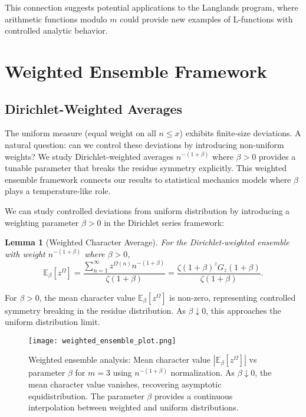 \documentclass[12pt]{article}
\newtheorem{lemma}[theorem]{Lemma}
\theoremstyle{definition}
\theoremstyle{remark}
\begin{document}
This connection suggests potential applications to the Langlands program, where arithmetic functions modulo $m$ could provide new examples of L-functions with controlled analytic behavior.

\section{Weighted Ensemble Framework}

\subsection{Dirichlet-Weighted Averages}

The uniform measure (equal weight on all $n \leq x$) exhibits finite-size deviations. A natural question: can we control these deviations by introducing non-uniform weights? We study Dirichlet-weighted averages $n^{-(1+\beta)}$ where $\beta > 0$ provides a tunable parameter that breaks the residue symmetry explicitly. This weighted ensemble framework connects our results to statistical mechanics models where $\beta$ plays a temperature-like role.

We can study controlled deviations from uniform distribution by introducing a weighting parameter $\beta > 0$ in the Dirichlet series framework:

\begin{lemma}[Weighted Character Average]
For the Dirichlet-weighted ensemble with weight $n^{-(1+\beta)}$ where $\beta > 0$,
\[
\mathbb{E}_\beta[z^{\Omega}] = \frac{\sum_{n=1}^\infty z^{\Omega(n)} n^{-(1+\beta)}}{\zeta(1+\beta)} = \frac{\zeta(1+\beta)^z G_z(1+\beta)}{\zeta(1+\beta)}.
\]
\end{lemma}

For $\beta > 0$, the mean character value $\mathbb{E}_\beta[z^{\Omega}]$ is non-zero, representing controlled symmetry breaking in the residue distribution. As $\beta \downarrow 0$, this approaches the uniform distribution limit.

\begin{figure}[ht]
\centering
\texttt{[image: weighted\_ensemble\_plot.png]}
\caption{Weighted ensemble analysis: Mean character value $|\mathbb{E}_\beta[z^{\Omega}]|$ vs parameter $\beta$ for $m = 3$ using $n^{-(1+\beta)}$ normalization. As $\beta \downarrow 0$, the mean character value vanishes, recovering asymptotic equidistribution. The parameter $\beta$ provides a continuous interpolation between weighted and uniform distributions.}
\label{fig:weighted}
\end{figure}
\end{document}
